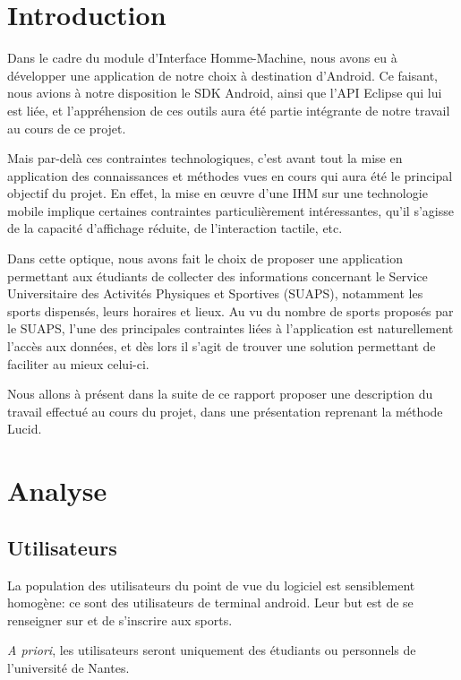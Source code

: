 \documentclass[french, titlepage, 11pt, a4paper]{article}
\begin{document}
\tableofcontents\clearpage

\section*{Introduction}

Dans le cadre du module d'Interface Homme-Machine, nous avons eu à développer
une application de notre choix à destination d'Android.
Ce faisant, nous avions à notre disposition le SDK Android, ainsi que l'API
Eclipse qui lui est liée, et l'appréhension de ces outils aura été partie
intégrante de notre travail au cours de ce projet.

Mais par-delà ces contraintes technologiques, c'est avant tout la mise en
application des connaissances et méthodes vues en cours qui aura été le
principal objectif du projet.
En effet, la mise en \oe uvre d'une IHM sur une technologie mobile implique
certaines contraintes particulièrement intéressantes, qu'il s'agisse de la
capacité d'affichage réduite, de l'interaction tactile, etc.

Dans cette optique, nous avons fait le choix de proposer une application
permettant aux étudiants de collecter des informations concernant le Service
Universitaire des Activités Physiques et Sportives (SUAPS), notamment les sports
dispensés, leurs horaires et lieux.
Au vu du nombre de sports proposés par le SUAPS, l'une des principales
contraintes liées à l'application est naturellement l'accès aux données, et dès
lors il s'agit de trouver une solution permettant de faciliter au mieux
celui-ci.

Nous allons à présent dans la suite de ce rapport proposer une description du
travail effectué au cours du projet, dans une présentation reprenant la méthode
Lucid.

\section{Analyse}
\label{sec:analyse}

	\subsection{Utilisateurs}
		La population des utilisateurs du point de vue du logiciel est
		sensiblement homogène: ce sont des utilisateurs de terminal android.
		Leur but est de se renseigner sur et de s'inscrire aux sports.

		\emph{A priori}, les utilisateurs seront uniquement des étudiants ou
		personnels de l'université de Nantes.
\end{document}
